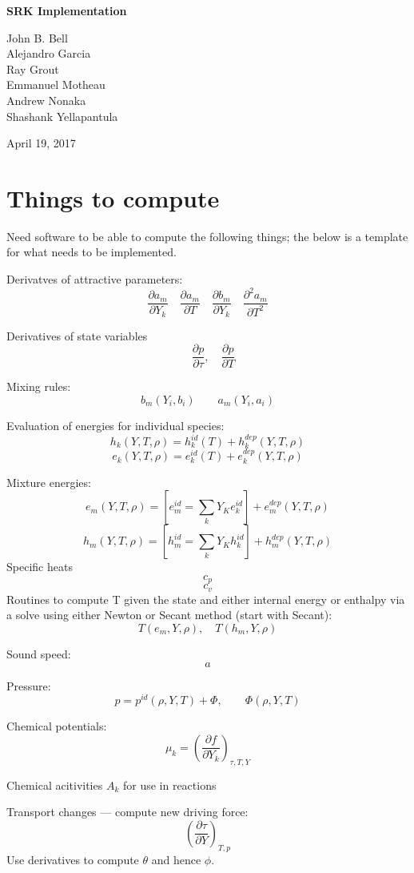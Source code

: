 \documentclass[11pt]{article}
\newcommand{\MarginPar}[1]{\marginpar{%
\vskip-\baselineskip %
\raggedright\tiny\sffamily
\hrule\smallskip{\color{red}#1}\par\smallskip\hrule}}
\begin{document}
\begin{center}
{\bf
SRK Implementation
}

\vspace{\baselineskip}
John B. Bell \\
Alejandro Garcia \\
Ray Grout \\
Emmanuel Motheau \\
Andrew Nonaka \\
Shashank Yellapantula

\vspace{\baselineskip}
April 19, 2017
\end{center}

\section{Things to compute}
Need software to be able to compute the following things; the below is a template for what needs to be implemented. 

Derivatves of attractive parameters:
\[
\frac{\partial a_m}{\partial Y_k} \quad \frac{\partial a_m}{\partial T} \quad \frac{\partial b_m}{\partial Y_k} \quad \frac{\partial^2 a_m}{\partial T^2}
\]

Derivatives of state variables
\[
\quad \frac{\partial p}{\partial \tau}, \quad \frac{\partial p}{\partial T}
\]

Mixing rules:
\[
b_m(Y_i,b_i) \qquad a_m(Y_i,a_i)
\]

Evaluation of energies for individual species:
\[
h_k(Y, T, \rho) = h_k^{id}(T) + h_k^{dep}(Y,T,\rho)
\]
\[
e_k(Y, T, \rho) = e_k^{id}(T) + e_k^{dep}(Y,T,\rho)
\]

Mixture energies:
\[
e_m(Y, T, \rho) = \left[e_m^{id} = \sum_k Y_Ke_k^{id}\right] + e_m^{dep}(Y,T,\rho)
\]
\[
h_m(Y, T, \rho) = \left[h_m^{id} = \sum_k Y_Kh_k^{id}\right] + h_m^{dep}(Y,T,\rho)
\]
Specific heats
\[
c_p 
\]
\[
c_v
\]
Routines to compute T given the state and either internal energy or enthalpy via a solve using either Newton or Secant method (start with Secant):
\[
T(e_m,Y,\rho), \quad T(h_m,Y,\rho)
\]

Sound speed:
\[
a
\]

Pressure:
\[
p = p^{id}(\rho, Y, T) + \Phi,  \qquad \Phi(\rho, Y, T)
\]

Chemical potentials:
\[
\mu_k = \left(\frac{\partial f}{\partial Y_k}\right)_{\tau,T,Y}
\]

Chemical acitivities $A_k$ for use in reactions

Transport changes --- compute new driving force: 
\MarginPar{Need to check this}
\[
\left(\frac{\partial \tau}{\partial Y}\right)_{T,p}
\]
Use derivatives to compute $\theta$ and hence $\phi$.
\end{document}
